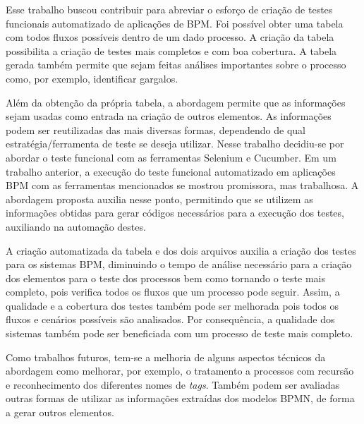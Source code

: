 \documentclass[12pt]{article}
\begin{document}
Esse trabalho buscou contribuir para abreviar o esforço de criação de testes funcionais automatizado de aplicações de BPM. Foi possível obter uma tabela com todos fluxos possíveis dentro de um dado processo. A criação da tabela possibilita a criação de testes mais completos e com boa cobertura. A tabela gerada também permite que sejam feitas análises importantes sobre o processo como, por exemplo, identificar gargalos.

Além da obtenção da própria tabela, a abordagem permite que as informações sejam usadas como entrada na criação de outros elementos. As informações podem ser reutilizadas das mais diversas formas, dependendo de qual estratégia/ferramenta de teste se deseja utilizar. Nesse trabalho decidiu-se por abordar o teste funcional com as ferramentas Selenium e Cucumber. Em um trabalho anterior, a execução do teste funcional automatizado em aplicações BPM com as ferramentas mencionados se mostrou promissora, mas trabalhosa. A abordagem proposta auxilia nesse ponto, permitindo que se utilizem as informações obtidas para gerar códigos necessários para a execução dos testes, auxiliando na automação destes.

A criação automatizada da tabela e dos dois arquivos auxilia a criação dos testes para os sistemas BPM, diminuindo o tempo de análise necessário para a criação dos elementos para o teste dos processos bem como tornando o teste mais completo, pois verifica todos os fluxos que um processo pode seguir. Assim, a qualidade e a cobertura dos testes também pode ser melhorada pois todos os fluxos e cenários possíveis são analisados. Por consequência, a qualidade dos sistemas também pode ser beneficiada com um processo de teste mais completo.

Como trabalhos futuros, tem-se a melhoria de alguns aspectos técnicos da abordagem como melhorar, por exemplo, o tratamento a processos com recursão e reconhecimento dos diferentes nomes de \emph{tags}. Também podem ser avaliadas outras formas de utilizar as informações extraídas dos modelos BPMN, de forma a gerar outros elementos.
 




\end{document}
